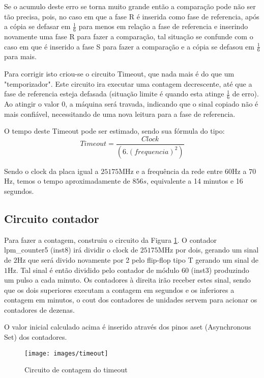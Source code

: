 \documentclass[12pt,a4paper,openany]{abntex2}
\begin{document}
Se o acumulo deste erro se torna muito grande então a comparação pode não ser tão precisa, pois, no caso em que a fase R é inserida como fase de referencia, após a cópia se defasar em $\frac{1}{6}$ para menos em relação a fase de referencia e inserindo novamente uma fase R para fazer a comparação, tal situação se confunde com o caso em que é inserido a fase S para fazer a comparação e a cópia se defasou em $\frac{1}{6}$ para mais.

Para corrigir isto criou-se o circuito Timeout, que nada mais é do que um "temporizador". Este circuito ira executar uma contagem decrescente, até que a fase de referencia esteja defasada (situação limite é quando esta atinge $\frac{1}{6}$ de erro). Ao atingir o valor 0, a máquina será travada, indicando que o sinal copiado não é mais confiável, necessitando de uma nova leitura para a fase de referencia.

O tempo deste Timeout pode ser estimado, sendo sua fórmula do tipo: $$Timeout = \frac{Clock}{\left(\left. 6 \right. . \left. \left(frequencia\right)^2\right.\right)}$$

Sendo o clock da placa igual a $25175$MHz e a frequência da rede entre $60$Hz a $70$Hz, temos o tempo aproximadamente de $856s$, equivalente a 14 minutos e 16 segundos.

\subsection{Circuito contador}

Para fazer a contagem, construiu o circuito da Figura \ref{fig:timeout}.
O contador lpm\_counter5 (inst8) irá dividir o clock de $25175$MHz por dois, gerando um sinal de $2$Hz que será divido novamente por 2 pelo flip-flop tipo T gerando um sinal de $1$Hz. Tal sinal é então dividido pelo contador de módulo 60 (inst3) produzindo um pulso a cada minuto. Os contadores à direita irão receber estes sinal, sendo que os dois superiores executam a contagem em segundos e os inferiores a contagem em minutos, o cout dos contadores de unidades servem para acionar os contadores de dezenas.

O valor inicial calculado acima é inserido através dos pinos aset (Asynchronous Set) dos contadores.

\begin{figure}[!htp]
	\centering
	\caption{Circuito de contagem do timeout}
	\texttt{[image: images/timeout]}
	\label{fig:timeout}
\end{figure}
\end{document}
